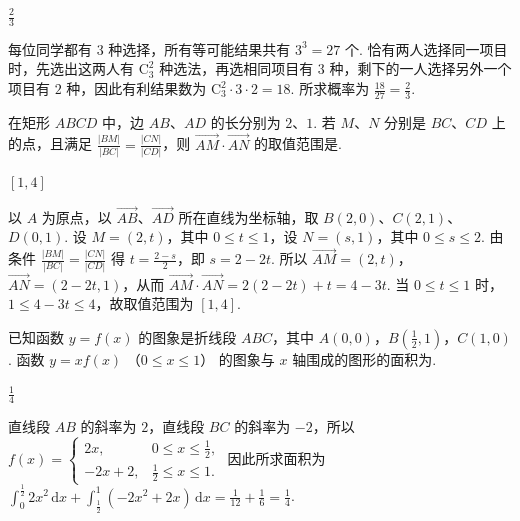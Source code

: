 \begin{answer}
\(\frac{2}{3}\)
\end{answer}

\begin{solution}
每位同学都有 \(3\) 种选择，所有等可能结果共有 \(3^3=27\) 个. 恰有两人选择同一项目时，先选出这两人有 \(\mathrm C_3^2\) 种选法，再选相同项目有 \(3\) 种，剩下的一人选择另外一个项目有 \(2\) 种，因此有利结果数为 \(\mathrm C_3^2\cdot3\cdot2=18\). 所求概率为 \(\frac{18}{27}=\frac{2}{3}\).
\end{solution}

\begin{problem}
在矩形 \(ABCD\) 中，边 \(AB\)、\(AD\) 的长分别为 \(2\)、\(1\). 若 \(M\)、\(N\) 分别是 \(BC\)、\(CD\) 上的点，且满足 \(\frac{|BM|}{|BC|} = \frac{|CN|}{|CD|}\)，则 \(\overrightarrow{AM} \cdot \overrightarrow{AN}\) 的取值范围是\fillinblank{}.
\end{problem}

\begin{answer}
\([1,4]\)
\end{answer}

\begin{solution}
以 \(A\) 为原点，以 \(\overrightarrow{AB}\)、\(\overrightarrow{AD}\) 所在直线为坐标轴，取 \(B(2,0)\)、\(C(2,1)\)、\(D(0,1)\). 设 \(M=(2,t)\)，其中 \(0\leqslant t\leqslant1\)，设 \(N=(s,1)\)，其中 \(0\leqslant s\leqslant2\). 由条件 \(\frac{|BM|}{|BC|}=\frac{|CN|}{|CD|}\) 得 \(t=\frac{2-s}{2}\)，即 \(s=2-2t\). 所以 \(\overrightarrow{AM}=(2,t)\)，\(\overrightarrow{AN}=(2-2t,1)\)，从而 \(\overrightarrow{AM}\cdot\overrightarrow{AN}=2(2-2t)+t=4-3t\). 当 \(0\leqslant t\leqslant1\) 时，\(1\leqslant4-3t\leqslant4\)，故取值范围为 \([1,4]\).
\end{solution}

\begin{problem}
已知函数 \( y = f(x) \) 的图象是折线段 \(ABC\)，其中 \(A(0,0)\)，\(B\left(\frac{1}{2}, 1\right)\)，\(C(1,0)\). 函数 \(y = xf(x)\) （\(0 \leqslant x \leqslant 1\)） 的图象与 \(x\) 轴围成的图形的面积为\fillinblank{}.
\end{problem}

\begin{answer}
\(\frac{1}{4}\)
\end{answer}

\begin{solution}
直线段 \(AB\) 的斜率为 \(2\)，直线段 \(BC\) 的斜率为 \(-2\)，所以
\(f(x)=\begin{cases}
2x,&0\leqslant x\leqslant\frac{1}{2},\\
-2x+2,&\frac{1}{2}\leqslant x\leqslant1.
\end{cases}\) 因此所求面积为 \(\displaystyle\int_0^{\frac{1}{2}}2x^2\,\mathrm dx+\int_{\frac{1}{2}}^1\left(-2x^2+2x\right)\,\mathrm dx=\frac{1}{12}+\frac{1}{6}=\frac{1}{4}\).
\end{solution}

